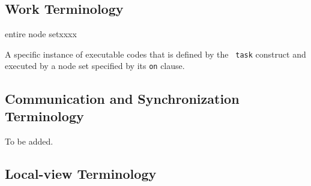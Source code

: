 \subsection{Work Terminology}

\begin{namelist}{entire node setxxxx}


A specific instance of executable codes that is defined by the {\tt
task} construct and executed by a node set specified by its {\tt on}
clause.


%

%


\end{namelist}


\subsection{Communication and Synchronization Terminology}

To be added.

\subsection{Local-view Terminology}

